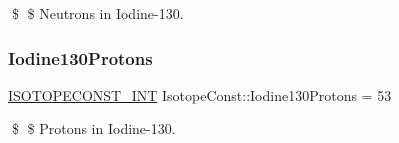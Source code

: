 \$ \$ Neutrons in Iodine-\/130. \mbox{\label{group___isotope_const-_iodine-_i130_gaab657478cd5e06995466a39566e5563f}} 
\subsubsection{\texorpdfstring{Iodine130\+Protons}{Iodine130Protons}}
{\footnotesize\ttfamily \mbox{\hyperlink{group___isotope_const-_macros_ga5f18360b3e99483a35c32d789e62621c}{I\+S\+O\+T\+O\+P\+E\+C\+O\+N\+S\+T\+\_\+\+I\+NT}} Isotope\+Const\+::\+Iodine130\+Protons = 53}

\$ \$ Protons in Iodine-\/130. 